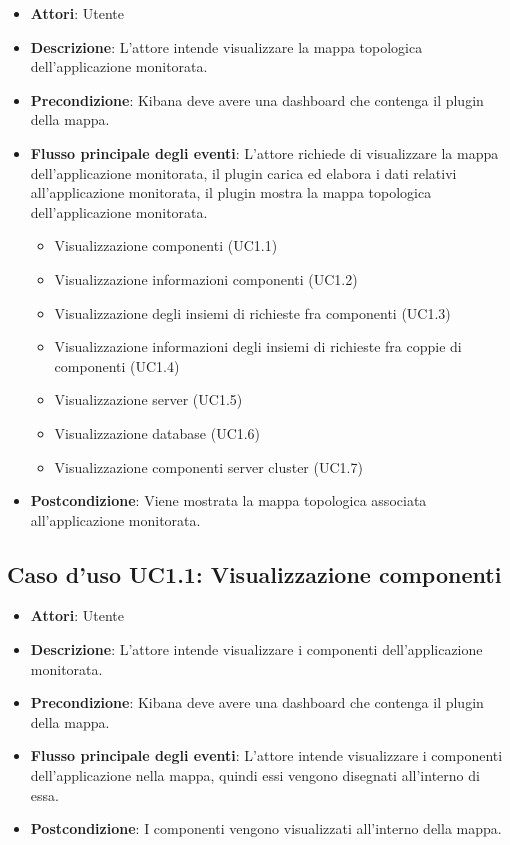 \begin{itemize}
	\item \textbf{Attori}: Utente
	\item \textbf{Descrizione}: L'attore intende visualizzare la mappa topologica dell'applicazione monitorata.
	
	\item \textbf{Precondizione}: Kibana deve avere una dashboard che contenga il plugin della mappa.
	\item \textbf{Flusso principale degli eventi}: L'attore richiede di visualizzare la mappa dell'applicazione monitorata, il plugin carica ed elabora i dati relativi all'applicazione monitorata, il plugin mostra la mappa topologica dell'applicazione monitorata.
	\begin{itemize}
		\item Visualizzazione componenti (UC1.1)
		\item Visualizzazione informazioni componenti (UC1.2)
		\item Visualizzazione degli insiemi di richieste fra componenti (UC1.3)
		\item Visualizzazione informazioni degli insiemi di richieste fra coppie di componenti (UC1.4)
		\item Visualizzazione server (UC1.5)
		\item Visualizzazione database (UC1.6)
		\item Visualizzazione componenti server cluster (UC1.7)
	\end{itemize}
	\item \textbf{Postcondizione}: Viene mostrata la mappa topologica associata all'applicazione monitorata.
\end{itemize}
\subsection{Caso d'uso UC1.1: Visualizzazione componenti}
\begin{itemize}
	\item \textbf{Attori}: Utente
	\item \textbf{Descrizione}: L'attore intende visualizzare i componenti dell'applicazione monitorata.
	\item \textbf{Precondizione}: Kibana deve avere una dashboard che contenga il plugin della mappa.
	\item \textbf{Flusso principale degli eventi}: L'attore intende visualizzare i componenti dell'applicazione nella mappa, quindi essi vengono disegnati all'interno di essa.
	\item \textbf{Postcondizione}: I componenti vengono visualizzati all'interno della mappa.
\end{itemize}
